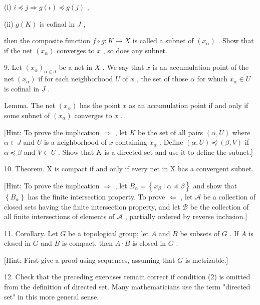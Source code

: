 \documentclass[10pt]{article}
\begin{document}
(i) \(i \preccurlyeq  j \Rightarrow  g\left( \iota \right)  \preccurlyeq  g\left( j\right)\) ,

(ii) \(g\left( K\right)\) is cofinal in \(J\) ,

then the composite function \(f \circ  g : K \rightarrow  X\) is called a subnet of \(\left( {x}_{\alpha }\right)\) . Show that if the net \(\left( {x}_{\alpha }\right)\) converges to \(x\) , so does any subnet.

9. Let \({\left( {x}_{\alpha }\right) }_{\alpha  \in  J}\) be a net in \(X\) . We say that \(x\) is an accumulation point of the net \(\left( {x}_{\alpha }\right)\) if for each neighborhood \(U\) of \(x\) , the set of those \(\alpha\) for whuch \({x}_{\alpha } \in  U\) is cofinal in \(J\) .

Lemma. The net \(\left( {x}_{\alpha }\right)\) has the point \(x\) as an accumulation point if and only if some subnet of \(\left( {x}_{\alpha }\right)\) converges to \(x\) .

[Hint: To prove the implication \(\Rightarrow\) , let \(K\) be the set of all pairs \(\left( {\alpha ,U}\right)\) where \(\alpha  \in  J\) and \(U\) is a neighborhood of \(x\) containing \({x}_{\alpha }\) . Define \(\left( {\alpha ,U}\right)  \preccurlyeq  \left( {\beta ,V}\right)\) if \(\alpha  \preccurlyeq  \beta\) and \(V \subset  U\) . Show that \(K\) is a directed set and use it to define the subnet.]

10. Theorem. X is compact if and only if every net in X has a convergent subnet.

[Hint: To prove the implication \(\Rightarrow\) , let \({B}_{\alpha } = \left\{  {{x}_{\beta } \mid  \alpha  \preccurlyeq  \beta }\right\}\) and show that \(\left\{  {B}_{\alpha }\right\}\) has the finite intersection property. To prove \(\Leftarrow\) , let \(\mathcal{A}\) be a collection of closed sets having the finite intersection property, and let \(\mathcal{B}\) be the collection of all finite intersections of elements of \(\mathcal{A}\) , partially ordered by reverse inclusion.]

11. Corollary. Let \(G\) be a topological group; let \(A\) and \(B\) be subsets of \(G\) . If \(A\) is closed in \(G\) and \(B\) is compact, then \(A \cdot  B\) is closed in \(G\) .

[Hint: First give a proof using sequences, assuming that \(G\) is metrizable.]

12. Check that the preceding exercises remain correct if condition (2) is omitted from the definition of directed set. Many mathematicians use the term "directed set" in this more general sense.
\end{document}
